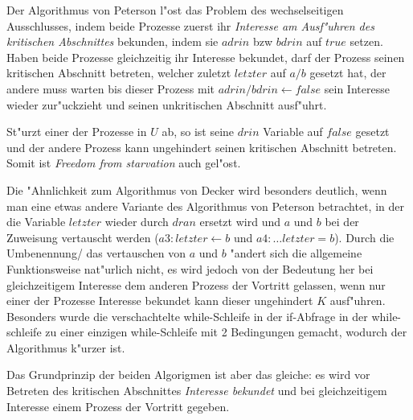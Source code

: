 \documentclass[a4paper,twoside,12pt,fleqn]{article}
\begin{document}
\begin{description}
	Der Algorithmus von Peterson l"ost das Problem des wechselseitigen
	Ausschlusses, indem beide Prozesse zuerst ihr \emph{Interesse am Ausf"uhren
		des kritischen Abschnittes} bekunden, indem sie $adrin$ bzw $bdrin$ auf
	$true$ setzen. Haben beide Prozesse gleichzeitig ihr Interesse bekundet,
	darf der Prozess seinen kritischen Abschnitt betreten, welcher zuletzt
	$letzter$ auf $a/b$ gesetzt hat, der andere muss warten bis dieser Prozess
	mit $adrin/bdrin \leftarrow false$ sein Interesse wieder zur"uckzieht und
	seinen unkritischen Abschnitt ausf"uhrt.

	St"urzt einer der Prozesse in $U$ ab, so ist seine $drin$ Variable auf $false$
	gesetzt und der andere Prozess kann ungehindert seinen kritischen Abschnitt
	betreten. Somit ist \emph{Freedom from starvation} auch gel"ost.

	Die "Ahnlichkeit zum Algorithmus von Decker wird besonders deutlich, wenn man
	eine etwas andere Variante des Algorithmus von Peterson betrachtet, in der
	die Variable $letzter$ wieder durch $dran$ ersetzt wird und $a$ und $b$ bei der
	Zuweisung vertauscht werden ($a3: letzter \leftarrow b$ und
	$a4: \dots letzter = b$). Durch die Umbenennung/ das vertauschen von $a$ und $b$
	"andert sich die allgemeine Funktionsweise nat"urlich nicht, es wird jedoch von
	der Bedeutung her bei gleichzeitigem Interesse dem anderen Prozess der Vortritt
	gelassen, wenn nur einer der Prozesse Interesse bekundet kann dieser ungehindert
	$K$ ausf"uhren. Besonders wurde die verschachtelte while-Schleife in der if-Abfrage
	in der while-schleife zu einer einzigen while-Schleife mit 2 Bedingungen gemacht,
	wodurch der Algorithmus k"urzer ist.

	Das Grundprinzip der beiden Algorigmen ist aber das gleiche: es wird vor
	Betreten des kritischen Abschnittes \emph{Interesse bekundet} und bei gleichzeitigem
	Interesse einem Prozess der Vortritt gegeben.
\end{description}
\end{document}
